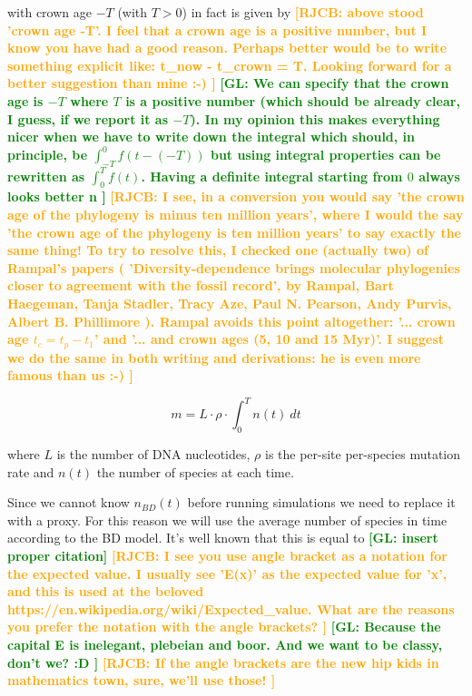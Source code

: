 \documentclass{article}
\newcommand*\richel[1]{\textcolor{orange}{\textbf{[RJCB: #1]}}}
\newcommand*\gio[1]{\textcolor{green}{\textbf{[GL: #1]}}}
\begin{document}
\begin{itemize}
with crown age $-T$ (with $T>0$) in fact is given by
\richel{
  above stood 'crown age -T'. 
  I feel that a crown age is a positive number,
  but I know you have had a good reason.
  Perhaps better would be to write something explicit like:
  t\_now - t\_crown = T.
  Looking forward for a better suggestion than mine :-)
}
\gio{
  We can specify that the crown age is $-T$ where $T$ is a positive number 
  (which should be already clear, I guess, 
  if we report it as $-T$). In my opinion this makes everything 
  nicer when we have to write down the integral which should, 
  in principle, be $\int_{-T}^{0} f(t-(-T))$ but using integral properties 
  can be rewritten as $\int_{0}^{T} f(t)$. Having a definite integral 
  starting from $0$ always looks better ^^.
}
\richel{
  I see, in a conversion you would say 'the crown age of the phylogeny is 
  minus ten million years', where I would the say 'the crown age of the 
  phylogeny is ten million years' to say exactly the same thing!
  To try to resolve this, I checked one (actually two) of Rampal's papers (
    'Diversity-dependence brings molecular phylogenies closer to agreement with the fossil record',
    by Rampal, Bart Haegeman, Tanja Stadler, Tracy Aze, Paul N. Pearson, Andy Purvis, Albert B. Phillimore
  ). Rampal avoids this point altogether: '... crown age $t_c = t_p − t_1$'
  and '... and crown ages (5, 10 and 15 Myr)'. I suggest we do the same in
  both writing and derivations: he is even more famous than us :-) 
}


\begin{equation}
m = L \cdot \rho \cdot \int_{0}^{T} n(t)\ dt \label{m calculation}
\end{equation}

where $L$ is the number of DNA nucleotides, 
$\rho$ is the per-site per-species mutation rate and
$n(t)$ the number of species at each time.

Since we cannot know $n_{BD}(t)$ before running simulations
we need to replace it with a proxy. 
For this reason we will use the average number of
species in time according to the BD model. 
It's well known that this is equal to \gio{insert proper citation}
\richel{
  I see you use angle bracket as a notation for the expected
  value. I usually see 'E(x)' as the expected value for 'x',
  and this is used at the beloved https://en.wikipedia.org/wiki/Expected\_value.
  What are the reasons you prefer the notation with the angle brackets?  
}
\gio{
  Because the capital E is inelegant, plebeian and boor. 
  And we want to be classy, don't we? :D
}
\richel{
  If the angle brackets are the new hip kids in mathematics town, sure,
  we'll use those!
}


\end{itemize}
\end{document}
